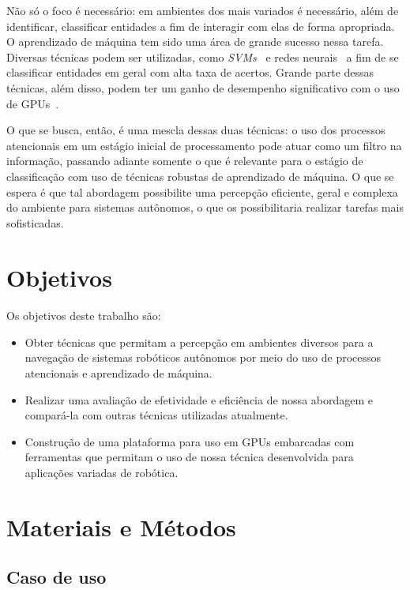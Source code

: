 \documentclass[10pt]{article}
\newcommand{\tit}[1]{\textit{#1}}
\begin{document}
Não só o foco é necessário: em ambientes dos mais variados é necessário, além
de identificar, classificar entidades a fim de interagir com elas de forma
apropriada. 
O aprendizado de máquina tem sido uma área de grande sucesso nessa tarefa.
Diversas técnicas podem ser utilizadas, como \tit{SVMs}~\cite{svm} 
e redes neurais~\cite{nn} a fim de se classificar entidades em geral com 
alta taxa de acertos. 
Grande parte dessas técnicas, além disso, podem ter um ganho de desempenho
significativo com o uso de GPUs~\cite{gpu}.

O que se busca, então, é uma mescla dessas duas técnicas: o uso dos processos
atencionais em um estágio inicial de processamento pode atuar como um filtro
na informação, passando adiante somente o que é relevante para o estágio de
classificação com uso de técnicas robustas de aprendizado de máquina. 
O que se espera é que tal abordagem possibilite uma percepção eficiente, geral
e complexa do ambiente para sistemas autônomos, o que os possibilitaria 
realizar tarefas mais sofisticadas.

\section{Objetivos}
\paragraph{}
Os objetivos deste trabalho são:
\begin{itemize}
	\item Obter técnicas que permitam a percepção em ambientes
		diversos para a navegação de sistemas robóticos autônomos por meio 
		do uso de processos atencionais e aprendizado de máquina.
	\item Realizar uma avaliação de efetividade e eficiência de nossa abordagem
		e compará-la com outras técnicas utilizadas atualmente.
	\item Construção de uma plataforma para uso em GPUs embarcadas com 
		ferramentas que permitam o uso de nossa técnica desenvolvida para
		aplicações variadas de robótica.
\end{itemize}

\section{Materiais e Métodos}
\subsection{Caso de uso}
\end{document}
